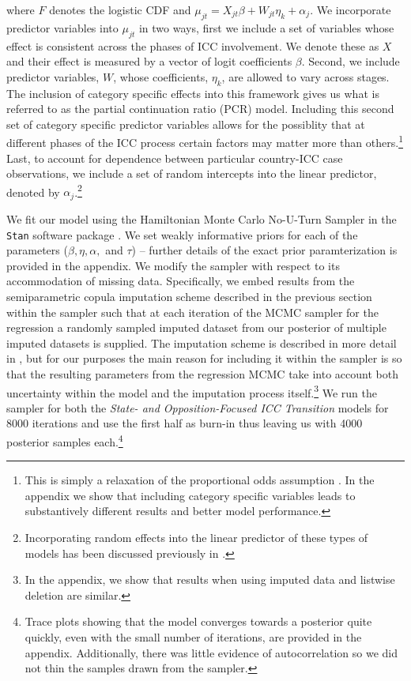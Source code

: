 where $F$ denotes the logistic CDF and $\mu_{jt} = X_{jt} \beta + W_{jt}\eta_{k} + \alpha_{j}$. We incorporate predictor variables into $\mu_{jt}$ in two ways, first we include a set of variables whose effect is consistent across the phases of ICC involvement. We denote these as $X$ and their effect is measured by a vector of logit coefficients $\beta$. Second, we include predictor variables, $W$, whose coefficients, $\eta_{k}$, are allowed to vary across stages. The inclusion of category specific effects into this framework gives us what is referred to as the partial continuation ratio (PCR) model. Including this second set of category specific predictor variables allows for the possiblity that at different phases of the ICC process certain factors may matter more than others.\footnote{This is simply a relaxation of the proportional odds assumption \citep{peterson1990partial}. In the appendix we show that including category specific variables leads to substantively different results and better model performance.} Last, to account for dependence between particular country-ICC case observations, we include a set of random intercepts into the linear predictor, denoted by $\alpha_{j}$.\footnote{Incorporating random effects into the linear predictor of these types of models has been discussed previously in \citet{have:uttal:1994, tutz:hennevogl:1996, dos2000continuation, hartzel2001multinomial}.}

We fit our model using the Hamiltonian Monte Carlo No-U-Turn Sampler in the \texttt{Stan} software package \citep{carpenter2017stan}. We set weakly informative priors for each of the parameters ($\beta, \eta, \alpha,$  and $\tau$) -- further details of the exact prior paramterization is provided in the appendix. We modify the sampler with respect to its accommodation of missing data. Specifically, we embed results from the semiparametric copula imputation scheme described in the previous section within the sampler such that at each iteration of the MCMC sampler for the regression a randomly sampled imputed dataset from our posterior of multiple imputed datasets is supplied. The imputation scheme is described in more detail in \citep{hollenbach:etal:2018}, but for our purposes the main reason for including it within the sampler is so that the resulting parameters from the regression MCMC take into account both uncertainty within the model and the imputation process itself.\footnote{In the appendix, we show that results when using imputed data and listwise deletion are similar.} We run the sampler for both the \emph{State- and Opposition-Focused ICC Transition} models for 8000 iterations and use the first half as burn-in thus leaving us with 4000 posterior samples each.\footnote{Trace plots showing that the model converges towards a posterior quite quickly, even with the small number of iterations, are provided in the appendix. Additionally, there was little evidence of autocorrelation so we did not thin the samples drawn from the sampler.} 

